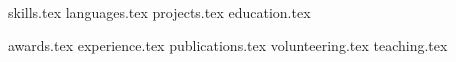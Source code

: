 \documentclass[letterpaper,11pt]{article}
\begin{document}
\newline
\\


\sidebyside
    {{skills.tex}}
    {{languages.tex}}
{projects.tex}
{education.tex}

\pagebreak

{awards.tex}
{experience.tex}
{publications.tex}
{volunteering.tex}
{teaching.tex}
\end{document}
